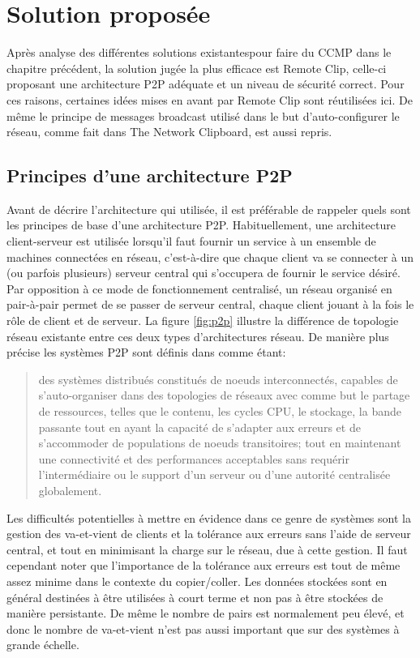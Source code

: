 \chapter{Solution proposée}
\renewcommand{\leftmark}{\thechapter.~~Solution proposée}
Après analyse des différentes solutions existantespour faire du CCMP dans
le chapitre précédent, la solution jugée la plus efficace
est Remote Clip, celle-ci proposant une architecture P2P adéquate et un
niveau de sécurité correct. Pour ces raisons, certaines idées mises en avant
par Remote Clip sont réutilisées ici. De même le principe de messages
broadcast utilisé dans le but d'auto-configurer le réseau, comme fait dans The
Network Clipboard, est aussi repris.

\section{Principes d'une architecture P2P}\label{sec:p2p}
Avant de décrire l'architecture qui utilisée, il est préférable
de rappeler quels sont les principes de base d'une architecture P2P.
Habituellement, une architecture client-serveur est utilisée lorsqu'il
faut fournir un service à un ensemble de machines connectées en réseau,
c'est-à-dire que chaque client va se connecter à un (ou parfois plusieurs)
serveur central qui s'occupera de fournir le service désiré. Par opposition à
ce mode de fonctionnement centralisé, un réseau organisé en pair-à-pair
permet de se passer de serveur central, chaque client jouant à la fois le rôle
de client et de serveur. La figure \ref{fig:p2p} illustre la différence
de topologie réseau existante entre ces deux types d'architectures réseau.
De manière plus précise les systèmes P2P sont définis dans \cite{AS04} comme
étant:
\begin{quote}
  des systèmes distribués constitués de noeuds interconnectés, capables de
  s'auto-organiser dans des topologies de réseaux avec comme but le partage
  de ressources, telles que le contenu, les cycles CPU, le stockage,
  la bande passante tout en ayant la capacité de s'adapter aux erreurs et
  de s'accommoder de populations de noeuds transitoires; tout en maintenant
  une connectivité et des performances acceptables sans requérir
  l'intermédiaire ou le support d'un serveur ou d'une autorité
  centralisée globalement.
\end{quote}

Les difficultés potentielles à mettre en évidence dans ce genre de systèmes
sont la gestion des va-et-vient de clients et la tolérance aux erreurs
sans l'aide de serveur central, et tout en minimisant la charge sur le réseau,
due à cette gestion. Il faut cependant noter que l'importance de la tolérance
aux erreurs est tout de même assez minime dans le contexte du copier/coller.
Les données stockées sont en général destinées à être utilisées à court terme
et non pas à être stockées de manière persistante. De même le nombre de pairs
est normalement peu élevé, et donc le nombre de va-et-vient n'est pas aussi
important que sur des systèmes à grande échelle.

